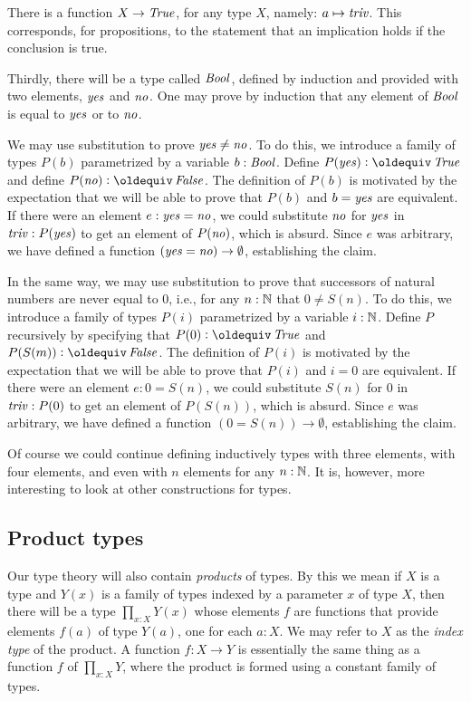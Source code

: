 There is a function $X \to \mathop{\mathit{True}}$, for any type $X$, namely: $a \mapsto \mathop{\mathit{triv}}$.  This corresponds, for propositions, to the statement that an
implication holds if the conclusion is true.

Thirdly, there will be a type called $\mathop{\mathit{Bool}}$, defined by induction and provided with two elements, $\mathop{\mathit{yes}}$ and $\mathop{\mathit{no}}$.  One may prove by induction
that any element of $\mathop{\mathit{Bool}}$ is equal to $\mathop{\mathit{yes}}$ or to $\mathop{\mathit{no}}$.

We may use substitution to prove $\mathop{\mathit{yes}} \ne \mathop{\mathit{no}}$.  To do this, we introduce a family of types $P(b)$ parametrized by a variable $b:\mathop{\mathit{Bool}}$.
Define $P(\yes) \defeq \true$ and define $P(\no) \defeq \false$.  The definition of $P(b)$ is motivated by the expectation that we will be able
to prove that $P(b)$ and $b = \mathop{\mathit{yes}}$ are equivalent.  If there were an element $e: \mathop{\mathit{yes}} = \mathop{\mathit{no}}$, we could substitute $\mathop{\mathit{no}}$ for $\mathop{\mathit{yes}}$ in $\mathop{\mathit{triv}} :
P (\mathop{\mathit{yes}})$ to get an element of $P(\mathop{\mathit{no}})$, which is absurd.  Since $e$ was arbitrary, we have defined a function $(\mathop{\mathit{yes}}=\mathop{\mathit{no}}) \to \emptyset$,
establishing the claim.

In the same way, we may use substitution to prove that successors of natural numbers are never equal to $0$, i.e., for any $n:\mathbb{N}$ that $0 \ne
S(n)$.  To do this, we introduce a family of types $P(i)$ parametrized by a variable $i:\mathbb{N}$.  Define $P$ recursively by specifying that $P(0)
\defeq \true$ and $P(S(m)) \defeq \false$.  The definition of $P(i)$ is motivated by the expectation that we will be able to prove that $P(i)$
and $i = 0$ are equivalent.  If there were an element $e: 0 = S(n)$, we could substitute $S(n)$ for $0$ in $\mathop{\mathit{triv}} : P ( 0 )$ to get an element
of $P(S(n))$, which is absurd.  Since $e$ was arbitrary, we have defined a function $(0=S(n)) \to \emptyset$, establishing the claim.

Of course we could continue defining inductively types with three elements, 
with four elements, and even with $n$ elements for any $n:\mathbb{N}$. It is,
however, more interesting to look at other constructions for types.

\subsection{Product types}
\label{sec:product-types}
Our type theory will also contain \emph{products} of types.  By this we mean if $X$ is a type and $Y(x)$ is a family of types indexed by a
parameter $x$ of type $X$, then there will be a type $\prod_{x:X} Y(x)$ whose elements $f$ are functions that provide elements $f(a)$ of type
$Y(a)$, one for each $a:X$. We may refer to $X$ as the \emph{index
  type} of the product.  A function $f : X \to Y$ is essentially the same thing as a function $f$ of $\prod_{x:X} Y$, where the product is
formed using a constant family of types.


